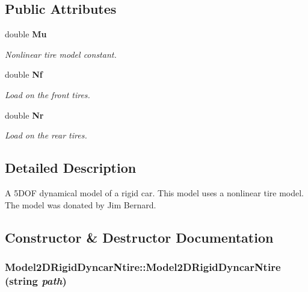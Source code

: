 \subsection*{Public Attributes}
\begin{CompactItemize}
\item 
double {\bf Mu}
\begin{CompactList}\small\item\em Nonlinear tire model constant.\item\end{CompactList}\item 
double {\bf Nf}
\begin{CompactList}\small\item\em Load on the front tires.\item\end{CompactList}\item 
double {\bf Nr}
\begin{CompactList}\small\item\em Load on the rear tires.\item\end{CompactList}\end{CompactItemize}


\subsection{Detailed Description}
A 5DOF dynamical model of a rigid car. This model uses a nonlinear tire model. The model was donated by Jim Bernard.



\subsection{Constructor \& Destructor Documentation}
\subsubsection{\setlength{\rightskip}{0pt plus 5cm}Model2DRigid\-Dyncar\-Ntire::Model2DRigid\-Dyncar\-Ntire (string {\em path})}\label{classModel2DRigidDyncarNtire_a0}


